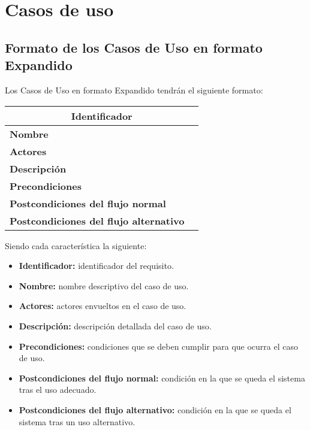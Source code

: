 \newpage
\section{Casos de uso}
\subsection{Formato de los Casos de Uso en formato Expandido}
\par Los Casos de Uso en formato Expandido tendrán el siguiente formato:

\begin{table}[h]
\begin{center}
\begin{tabular}{p{} p{11cm}}
\multicolumn{2}{c}{\textbf{Identificador} } \\ \hline \hline
\textbf{Nombre} &  \\ \hline
\textbf{Actores} &  \\ \hline
\textbf{Descripción} &  \\ \hline
\textbf{Precondiciones} &  \\ \hline
\textbf{Postcondiciones del flujo normal} &  \\ \hline
\textbf{Postcondiciones del flujo alternativo} &  \\ \hline
\end{tabular}
\end{center}
\end{table}

\par Siendo cada característica la siguiente:
\begin{itemize}
	\item \textbf{Identificador:} identificador del requisito.
	\item \textbf{Nombre:} nombre descriptivo del caso de uso.
	\item \textbf{Actores:} actores envueltos en el caso de uso.
	\item \textbf{Descripción:} descripción detallada del caso de uso.
	\item \textbf{Precondiciones:} condiciones que se deben cumplir para que ocurra el caso de uso.
	\item \textbf{Postcondiciones del flujo normal:} condición en la que se queda el sistema tras el uso adecuado.
	\item \textbf{Postcondiciones del flujo alternativo:} condición en la que se queda el sistema tras un uso alternativo.
\end{itemize}

